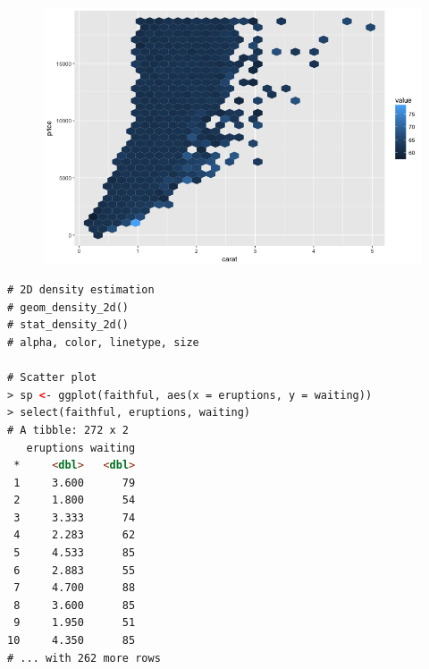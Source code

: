 \begin{figure}[H]\begin{center}\includegraphics[scale=1 ]{ilu/bg64.png}\end{center}\end{figure}
\begin{lstlisting}[language=html]
# 2D density estimation
# geom_density_2d()
# stat_density_2d()
# alpha, color, linetype, size

# Scatter plot
> sp <- ggplot(faithful, aes(x = eruptions, y = waiting))
> select(faithful, eruptions, waiting)
# A tibble: 272 x 2
   eruptions waiting
 *     <dbl>   <dbl>
 1     3.600      79
 2     1.800      54
 3     3.333      74
 4     2.283      62
 5     4.533      85
 6     2.883      55
 7     4.700      88
 8     3.600      85
 9     1.950      51
10     4.350      85
# ... with 262 more rows
\end{lstlisting}

